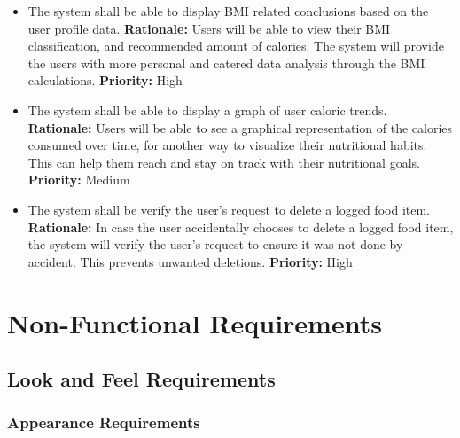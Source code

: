 \documentclass[12pt]{article}
\newcounter{FRCounter}
\newcommand{\FillFRNumber}{\textbf{FR\arabic{FRCounter}.} \stepcounter{FRCounter}}
\begin{document}
\begin{itemize}
	\item [\FillFRNumber] The system shall be able to display BMI related conclusions based on the user profile data. \newline
	\textbf{Rationale:} Users will be able to view their BMI classification, and recommended amount of calories. The system will provide the users with more personal and catered data analysis through the BMI calculations. \newline
	\textbf{Priority:} High
\end{itemize}

\begin{itemize}
	\item [\FillFRNumber] The system shall be able to display a graph of user caloric trends. \newline
	\textbf{Rationale:} Users will be able to see a graphical representation of the calories consumed over time, for another way to visualize their nutritional habits. This can help them reach and stay on track with their nutritional goals. \newline
	\textbf{Priority:} Medium
\end{itemize}

\begin{itemize}
	\item [\FillFRNumber] The system shall be verify the user's request to delete a logged food item.  \newline
	\textbf{Rationale:} In case the user accidentally chooses to delete a logged food item, the system will verify the user's request to ensure it was not done by accident. This prevents unwanted deletions. \newline
	\textbf{Priority:} High
\end{itemize}


\section{Non-Functional Requirements}

\subsection{Look and Feel Requirements}

\subsubsection{Appearance Requirements}
\end{document}
